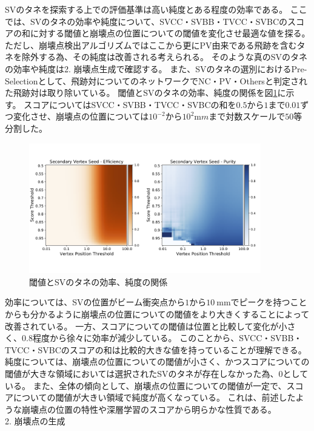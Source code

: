 SVのタネを探索する上での評価基準は高い純度とある程度の効率である。
ここでは、SVのタネの効率や純度について、SVCC・SVBB・TVCC・SVBCのスコアの和に対する閾値と崩壊点の位置についての閾値を変化させ最適な値を探る。
ただし、崩壊点検出アルゴリズムではここから更にPV由来である飛跡を含むタネを除外する為、その純度は改善される考えられる。
そのような真のSVのタネの効率や純度は2. 崩壊点生成で確認する。
また、SVのタネの選別におけるPre-Selectionとして、飛跡対についてのネットワークでNC・PV・Othersと判定された飛跡対は取り除いている。
閾値とSVのタネの効率、純度の関係を図\ref{4-2-0-1SVSeed}に示す。
スコアについてはSVCC・SVBB・TVCC・SVBCの和を$0.5$から$1$まで$0.01$ずつ変化させ、崩壊点の位置については$10^{-2}$から$10^{2} {\mathrm mm}$まで対数スケールで$50$等分割した。

\begin{figure}[htbp]
 \centering
 \includegraphics[width=0.9\textwidth, clip]{Figure/4VertexFinderwithDL/4-2-0-1SVSeed.png}
 \caption{閾値とSVのタネの効率、純度の関係}
 \label{4-2-0-1SVSeed}
\end{figure}

効率については、SVの位置がビーム衝突点から$1$から$10\ \mathrm{mm}$でピークを持つことからも分かるように崩壊点の位置についての閾値をより大きくすることによって改善されている。
一方、スコアについての閾値は位置と比較して変化が小さく、$0.8$程度から徐々に効率が減少している。
このことから、SVCC・SVBB・TVCC・SVBCのスコアの和は比較的大きな値を持っていることが理解できる。
純度については、崩壊点の位置についての閾値が小さく、かつスコアについての閾値が大きな領域においては選択されたSVのタネが存在しなかった為、$0$としている。
また、全体の傾向として、崩壊点の位置についての閾値が一定で、スコアについての閾値が大きい領域で純度が高くなっている。
これは、前述したような崩壊点の位置の特性や深層学習のスコアから明らかな性質である。\\

2. 崩壊点の生成\\

